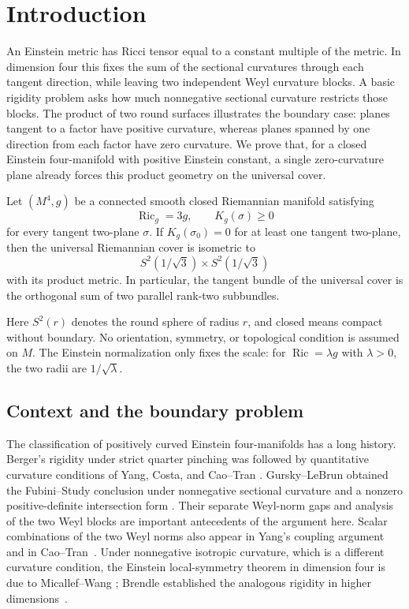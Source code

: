 \section{Introduction}\label{sec:introduction}

An Einstein metric has Ricci tensor equal to a constant multiple of the
metric. In dimension four this fixes the sum of the sectional curvatures
through each tangent direction, while leaving two independent Weyl
curvature blocks. A basic rigidity problem asks how much nonnegative
sectional curvature restricts those blocks. The product of two round
surfaces illustrates the boundary case: planes tangent to a factor have
positive curvature, whereas planes spanned by one direction from each
factor have zero curvature. We prove that, for a closed Einstein
four-manifold with positive Einstein constant, a single zero-curvature
plane already forces this product geometry on the universal cover.

\begin{theorem}\label{thm:main}
Let $(M^4,g)$ be a connected smooth closed Riemannian manifold satisfying
\[
 \operatorname{Ric}_g=3g,\qquad K_g(\sigma)\ge0
\]
for every tangent two-plane $\sigma$. If $K_g(\sigma_0)=0$ for at least
one tangent two-plane, then the universal Riemannian cover is isometric to
\[
 S^2(1/\sqrt3)\times S^2(1/\sqrt3)
\]
with its product metric. In particular, the tangent bundle of the
universal cover is the orthogonal sum of two parallel rank-two subbundles.
\end{theorem}

Here $S^2(r)$ denotes the round sphere of radius $r$, and closed means
compact without boundary. No orientation, symmetry, or topological
condition is assumed on $M$. The Einstein normalization only fixes the
scale: for $\operatorname{Ric}=\lambda g$ with $\lambda>0$, the two
radii are $1/\sqrt\lambda$.

\subsection{Context and the boundary problem}

The classification of positively curved Einstein four-manifolds has a
long history. Berger's rigidity under strict quarter pinching
\cite{Berger1961} was followed by quantitative curvature conditions of
Yang, Costa, and Cao--Tran
\cite{Yang2000,Costa2004,CaoTran2018}. Gursky--LeBrun obtained the
Fubini--Study conclusion under nonnegative sectional curvature and a
nonzero positive-definite intersection form
\cite[Theorem~A]{GurskyLeBrun1999}. Their separate Weyl-norm gaps and
analysis of the two Weyl blocks are important antecedents of the
argument here. Scalar combinations of the two Weyl norms also appear in
Yang's coupling argument~\cite[Section~6]{Yang2000} and in
Cao--Tran~\cite[Proposition~2.2]{CaoTran2018}. Under nonnegative isotropic curvature, which is a
different curvature condition, the Einstein local-symmetry theorem in
dimension four is due to Micallef--Wang
\cite[Theorem~4.4]{MicallefWang1993}; Brendle established the analogous
rigidity in higher dimensions~\cite[Theorem~1]{Brendle2010}.

